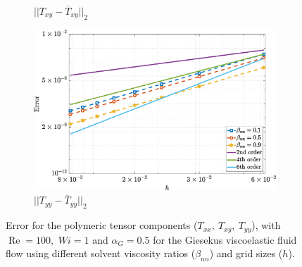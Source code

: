 \documentclass[preprint, 12pt]{elsarticle}
\begin{document}
\begin{figure}[H]
\begin{subfigure}[b]{.46\textwidth}
        \caption{$||T_{xy} - \overline{T}_{xy}||_{2}$}
        \label{error_txy_2nd_Case1_giesekus_alphaG_0.5}
    \end{subfigure}
    \qquad
    \begin{subfigure}[b]{.46\textwidth}
        \includegraphics[width=\textwidth]{NormErr_2nd_Re_100_Wi_1_epsilon_0_xi_0_alphaG_0.5_Dt_1e-06_at_0.05_tipsim_1_MMS_12_Tyy.eps}
        \caption{$||T_{yy} - \overline{T}_{yy}||_{2}$}
        \label{error_tyy_2nd_Case1_giesekus_alphaG_0.5}
    \end{subfigure}
    \vspace{0.02cm}
    \caption{Error for the polymeric tensor components ($T_{xx},~T_{xy},~T_{yy}$), with $\operatorname{Re}=100,$ $Wi=1$ and $\alpha_{G} = 0.5$ for the Giesekus viscoelastic fluid flow using different solvent viscosity ratios ($\beta_{nn}$) and grid sizes ($h$).\label{GEerror052}}
\end{figure}
\end{document}
